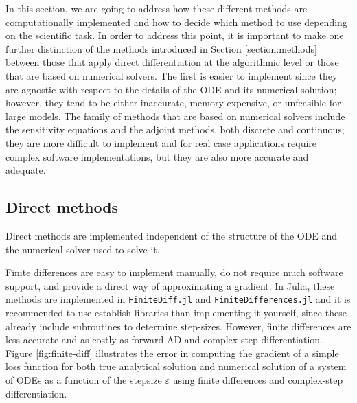 
In this section, we are going to address how these different methods are computationally implemented and how to decide which method to use depending on the scientific task.
In order to address this point, it is important to make one further distinction of the methods introduced in Section \ref{section:methods} between those that apply direct differentiation at the algorithmic level or those that are based on numerical solvers.  
The first is easier to implement since they are agnostic with respect to the details of the ODE and its numerical solution; however, they tend to be either inaccurate, memory-expensive, or unfeasible for large models. 
The family of methods that are based on numerical solvers include the sensitivity equations and the adjoint methods, both discrete and continuous; they are more difficult to implement and for real case applications require complex software implementations, but they are also more accurate and adequate. 

\subsection{Direct methods}

Direct methods are implemented independent of the structure of the ODE and the numerical solver used to solve it. 


Finite differences are easy to implement manually, do not require much software support, and provide a direct way of approximating a gradient. 
In Julia, these methods are implemented in \texttt{FiniteDiff.jl} and \texttt{FiniteDifferences.jl} and it is recommended to use establish libraries than implementing it yourself, since these already include subroutines to determine step-sizes.
However, finite differences are less accurate and as costly as forward AD \cite{Griewack-on-AD} and complex-step differentiation. 
Figure \ref{fig:finite-diff} illustrates the error in computing the gradient of a simple loss function for both true analytical solution and numerical solution of a system of ODEs as a function of the stepsize $\varepsilon$ using finite differences and complex-step differentiation.

